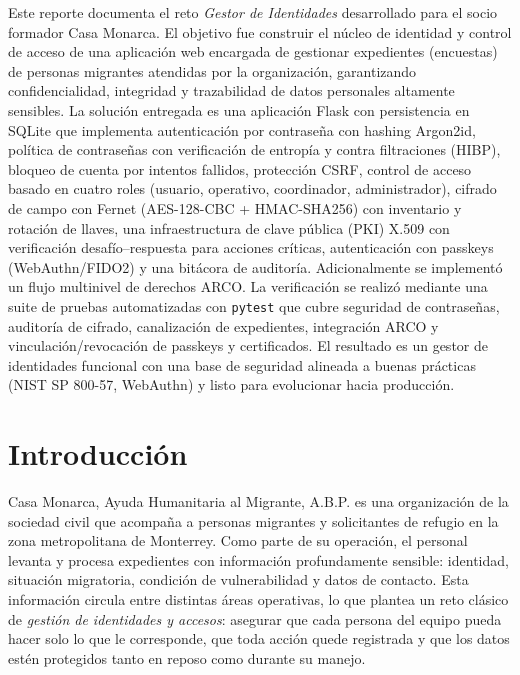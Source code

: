 \documentclass[10pt,letterpaper]{report}
\renewcommand{\_}{\textunderscore\allowbreak}
\begin{document}
Este reporte documenta el reto \textit{Gestor de Identidades}
desarrollado para el socio formador Casa Monarca. El objetivo fue construir el
n\'ucleo de identidad y control de acceso de una aplicaci\'on web encargada de
gestionar expedientes (encuestas) de personas migrantes atendidas por la
organizaci\'on, garantizando confidencialidad, integridad y trazabilidad de
datos personales altamente sensibles. La soluci\'on entregada es una aplicaci\'on
Flask con persistencia en SQLite que implementa autenticaci\'on por
contrase\~na con hashing Argon2id, pol\'itica de contrase\~nas con verificaci\'on
de entrop\'ia y contra filtraciones (HIBP), bloqueo de cuenta por intentos
fallidos, protecci\'on CSRF, control de acceso basado en cuatro roles
(usuario, operativo, coordinador, administrador), cifrado de campo con Fernet
(AES-128-CBC + HMAC-SHA256) con inventario y rotaci\'on de llaves, una
infraestructura de clave p\'ublica (PKI) X.509 con verificaci\'on
desaf\'io--respuesta para acciones cr\'iticas, autenticaci\'on con passkeys
(WebAuthn/FIDO2) y una bit\'acora de auditor\'ia. Adicionalmente se implement\'o
un flujo multinivel de derechos ARCO. La verificaci\'on se realiz\'o mediante una
suite de pruebas automatizadas con \texttt{pytest} que cubre seguridad de
contrase\~nas, auditor\'ia de cifrado, canalizaci\'on de expedientes, integraci\'on
ARCO y vinculaci\'on/revocaci\'on de passkeys y certificados. El resultado es un
gestor de identidades funcional con una base de seguridad alineada a buenas
pr\'acticas (NIST SP 800-57, WebAuthn) y listo para evolucionar hacia
producci\'on.

\clearpage
{}

\chapter{Introducci\'on}

Casa Monarca, Ayuda Humanitaria al Migrante, A.B.P. es una organizaci\'on de la
sociedad civil que acompa\~na a personas migrantes y solicitantes de refugio en
la zona metropolitana de Monterrey. Como parte de su operaci\'on, el personal
levanta y procesa expedientes con informaci\'on profundamente sensible:
identidad, situaci\'on migratoria, condici\'on de vulnerabilidad y datos de
contacto. Esta informaci\'on circula entre distintas \'areas operativas, lo que
plantea un reto cl\'asico de \textit{gesti\'on de identidades y accesos}:
asegurar que cada persona del equipo pueda hacer solo lo que le corresponde,
que toda acci\'on quede registrada y que los datos est\'en protegidos tanto en
reposo como durante su manejo.
\end{document}
